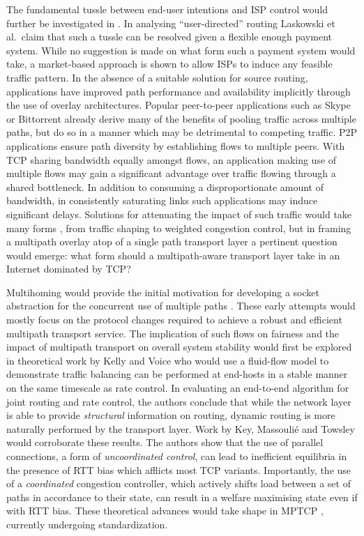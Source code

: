 The fundamental tussle between end-user intentions and \ac{ISP} control would further be investigated in \cite{Laskowski:2008p244}.
In analysing ``user-directed'' routing Laskowski et al.\ claim that such a tussle can be resolved given a flexible enough payment system.
While no suggestion is made on what form such a payment system would take, a market-based approach is shown to allow \acp{ISP} to induce any feasible traffic pattern.
In the absence of a suitable solution for source routing, applications have improved path performance and availability implicitly through the use of overlay architectures.
Popular peer-to-peer applications such as Skype or Bittorrent already derive many of the benefits of pooling traffic across multiple paths, but do so in a manner which may be detrimental to competing traffic.
\ac{P2P} applications ensure path diversity by establishing flows to multiple peers.
With \ac{TCP} sharing bandwidth equally amongst flows, an application making use of multiple flows may gain a significant advantage over traffic flowing through a shared bottleneck.
In addition to consuming a disproportionate amount of bandwidth, in consistently saturating links such applications may induce significant delays.
Solutions for attenuating the impact of such traffic would take many forms \cite{Peterson:2009p178}, from traffic shaping to weighted congestion control, but in framing a multipath overlay atop of a single path transport layer a pertinent question would emerge: what form should a multipath-aware transport layer take in an Internet dominated by \ac{TCP}?

Multihoming would provide the initial motivation for developing a socket abstraction for the concurrent use of multiple paths \cite{Huitema:1995p543,Hsieh:2002p538,Iyengar:2006p542}.
These early attempts would mostly focus on the protocol changes required to achieve a robust and efficient multipath transport service.
The implication of such flows on fairness and the impact of multipath transport on overall system stability would first be explored in theoretical work by Kelly and Voice \cite{Kelly:2005p140} who would use a fluid-flow model to demonstrate traffic balancing can be performed at end-hosts in a stable manner on the same timescale as rate control.
In evaluating an end-to-end algorithm for joint routing and rate control, the authors conclude that while the network layer is able to provide \emph{structural} information on routing, dynamic routing is more naturally performed by the transport layer.
Work by Key, Massouli\'{e} and Towsley \cite{Key:2007p130} would corroborate these results. 
The authors show that the use of parallel connections, a form of \emph{uncoordinated control}, can lead to inefficient equilibria in the presence of \ac{RTT} bias which afflicts most \ac{TCP} variants. Importantly, the use of a \emph{coordinated} congestion controller, which actively shifts load between a set of paths in accordance to their state, can result in a welfare maximising state even if with \ac{RTT} bias.
These theoretical advances would take shape in \ac{MPTCP} \cite{Wischik:2011p540}, currently undergoing standardization.

